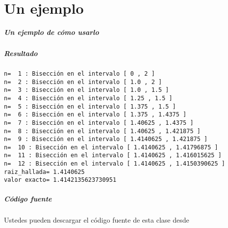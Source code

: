 \documentclass[11pt]{beamer}
\def\azul{\color{blue}}
\def\rojo{\color{red}}
\begin{document}
\part{Un ejemplo}

\frame{\partpage}


\begin{frame}

\frametitle{Un ejemplo de cómo usarlo}



\end{frame}

\begin{frame}[fragile]
\frametitle{Resultado}

{\azul 
\begin{verbatim}
n=  1 : Bisección en el intervalo [ 0 , 2 ]
n=  2 : Bisección en el intervalo [ 1.0 , 2 ]
n=  3 : Bisección en el intervalo [ 1.0 , 1.5 ]
n=  4 : Bisección en el intervalo [ 1.25 , 1.5 ]
n=  5 : Bisección en el intervalo [ 1.375 , 1.5 ]
n=  6 : Bisección en el intervalo [ 1.375 , 1.4375 ]
n=  7 : Bisección en el intervalo [ 1.40625 , 1.4375 ]
n=  8 : Bisección en el intervalo [ 1.40625 , 1.421875 ]
n=  9 : Bisección en el intervalo [ 1.4140625 , 1.421875 ]
n=  10 : Bisección en el intervalo [ 1.4140625 , 1.41796875 ]
n=  11 : Bisección en el intervalo [ 1.4140625 , 1.416015625 ]
n=  12 : Bisección en el intervalo [ 1.4140625 , 1.4150390625 ]
raiz_hallada= 1.4140625
valor exacto= 1.4142135623730951

\end{verbatim}
}
\end{frame}

\begin{frame}

\frametitle{Código fuente}

{\Large

Ustedes pueden descargar el código fuente de esta clase desde

\bigskip

\rojo{
\begin{url}
https://github.com/pdenapo/metodos-numericos
\end{url}
}}

\end{frame}
\end{document}

